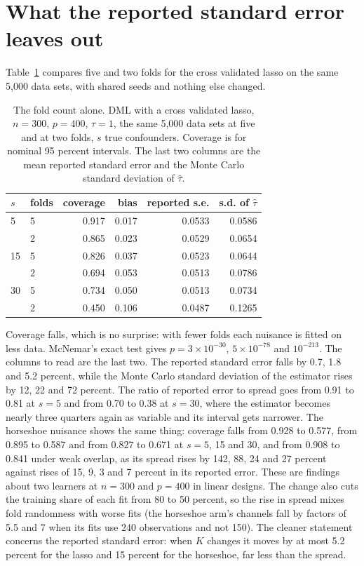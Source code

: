 \section{What the reported standard error leaves out}\label{sec:crit:se}

Table~\ref{tab:crit:folds} compares five and two folds for the cross validated lasso on the same 5,000 data sets, with shared seeds and nothing else changed.

\begin{table}[ht]
\centering
\small
\caption{The fold count alone. DML with a cross validated lasso, $n = 300$, $p = 400$, $\tau = 1$, the same 5,000 data sets at five and at two folds, $s$ true confounders. Coverage is for nominal 95 percent intervals. The last two columns are the mean reported standard error and the Monte Carlo standard deviation of $\hat\tau$.}
\label{tab:crit:folds}
\begin{tabular}{@{}llrrrr@{}}
\toprule
$s$ & folds & coverage & bias & reported s.e. & s.d. of $\hat\tau$ \\
\midrule
5 & 5 & 0.917 & 0.017 & 0.0533 & 0.0586 \\
 & 2 & 0.865 & 0.023 & 0.0529 & 0.0654 \\
15 & 5 & 0.826 & 0.037 & 0.0523 & 0.0644 \\
 & 2 & 0.694 & 0.053 & 0.0513 & 0.0786 \\
30 & 5 & 0.734 & 0.050 & 0.0513 & 0.0734 \\
 & 2 & 0.450 & 0.106 & 0.0487 & 0.1265 \\
\bottomrule
\end{tabular}
\end{table}

Coverage falls, which is no surprise: with fewer folds each nuisance is fitted on less data. McNemar's exact test gives $p = 3\times 10^{-30}$, $5\times 10^{-78}$ and $10^{-213}$. The columns to read are the last two. The reported standard error falls by 0.7, 1.8 and 5.2 percent, while the Monte Carlo standard deviation of the estimator rises by 12, 22 and 72 percent. The ratio of reported error to spread goes from 0.91 to 0.81 at $s = 5$ and from 0.70 to 0.38 at $s = 30$, where the estimator becomes nearly three quarters again as variable and its interval gets narrower. The horseshoe nuisance shows the same thing: coverage falls from 0.928 to 0.577, from 0.895 to 0.587 and from 0.827 to 0.671 at $s = 5$, 15 and 30, and from 0.908 to 0.841 under weak overlap, as its spread rises by 142, 88, 24 and 27 percent against rises of 15, 9, 3 and 7 percent in its reported error. These are findings about two learners at $n = 300$ and $p = 400$ in linear designs. The change also cuts the training share of each fit from 80 to 50 percent, so the rise in spread mixes fold randomness with worse fits (the horseshoe arm's channels fall by factors of 5.5 and 7 when its fits use 240 observations and not 150). The cleaner statement concerns the reported standard error: when $K$ changes it moves by at most 5.2 percent for the lasso and 15 percent for the horseshoe, far less than the spread.

